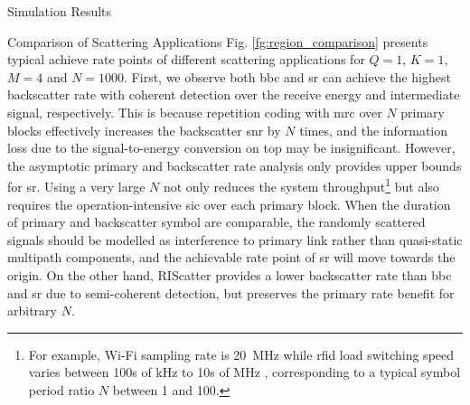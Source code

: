 \documentclass[journal]{IEEEtran}
\begin{document}
\begin{section}{Simulation Results}
\begin{subsection}{Comparison of Scattering Applications}
		Fig. \ref{fg:region_comparison} presents typical achieve rate points of different scattering applications for $Q=1$, $K=1$, $M=4$ and $N=1000$.
		First, we observe both \gls{bbc} and \gls{sr} can achieve the highest backscatter rate with coherent detection over the receive energy and intermediate signal, respectively.
		This is because repetition coding with \gls{mrc} over $N$ primary blocks effectively increases the backscatter \gls{snr} by $N$ times, and the information loss due to the signal-to-energy conversion on top may be insignificant.
		However, the asymptotic primary and backscatter rate analysis only provides upper bounds for \gls{sr}.
		Using a very large $N$ not only reduces the system throughput\footnote{For example, Wi-Fi sampling rate is \qty{20}{\MHz} while \gls{rfid} load switching speed varies between \num{100}s of \unit{\kHz} to \num{10}s of \unit{\MHz} \cite{Torres2021}, corresponding to a typical symbol period ratio $N$ between \num{1} and \num{100}.} but also requires the operation-intensive \gls{sic} over each primary block.
		When the duration of primary and backscatter symbol are comparable, the randomly scattered signals should be modelled as interference to primary link rather than quasi-static multipath components, and the achievable rate point of \gls{sr} will move towards the origin.
		On the other hand, RIScatter provides a lower backscatter rate than \gls{bbc} and \gls{sr} due to semi-coherent detection, but preserves the primary rate benefit for arbitrary $N$.
	\end{subsection}


\end{section}
\end{document}
